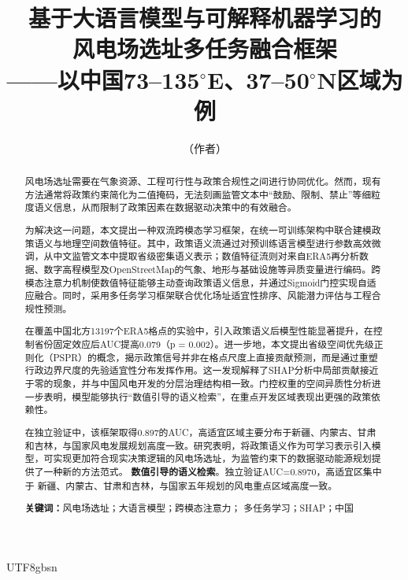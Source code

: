 \documentclass[12pt, a4paper]{article}
\begin{document}
\begin{CJK}{UTF8}{gbsn}

\title{\textbf{基于大语言模型与可解释机器学习的\\[0.3em]
风电场选址多任务融合框架}\\[0.5em]
{\large ——以中国73--135$^\circ$E、37--50$^\circ$N区域为例}}
\author{（作者）}
\date{}
\maketitle
\thispagestyle{fancy}

\begin{abstract}
风电场选址需要在气象资源、工程可行性与政策合规性之间进行协同优化。然而，现有方法通常将政策约束简化为二值掩码，无法刻画监管文本中“鼓励、限制、禁止”等细粒度语义信息，从而限制了政策因素在数据驱动决策中的有效融合。

为解决这一问题，本文提出一种双流跨模态学习框架，在统一可训练架构中联合建模政策语义与地理空间数值特征。其中，政策语义流通过对预训练语言模型进行参数高效微调，从中文监管文本中提取省级密集语义表示；数值特征流则对来自ERA5再分析数据、数字高程模型及OpenStreetMap的气象、地形与基础设施等异质变量进行编码。跨模态注意力机制使数值特征能够主动查询政策语义信息，并通过Sigmoid门控实现自适应融合。同时，采用多任务学习框架联合优化场址适宜性排序、风能潜力评估与工程合规性预测。

在覆盖中国北方13197个ERA5格点的实验中，引入政策语义后模型性能显著提升，在控制省份固定效应后AUC提高0.079（p = 0.002）。进一步地，本文提出省级空间优先级正则化（PSPR）的概念，揭示政策信号并非在格点尺度上直接贡献预测，而是通过重塑行政边界尺度的先验适宜性分布发挥作用。这一发现解释了SHAP分析中局部贡献接近于零的现象，并与中国风电开发的分层治理结构相一致。门控权重的空间异质性分析进一步表明，模型能够执行“数值引导的语义检索”，在重点开发区域表现出更强的政策依赖性。

在独立验证中，该框架取得0.897的AUC，高适宜区域主要分布于新疆、内蒙古、甘肃和吉林，与国家风电发展规划高度一致。研究表明，将政策语义作为可学习表示引入模型，可实现更加符合现实决策逻辑的风电场选址，为监管约束下的数据驱动能源规划提供了一种新的方法范式。
\textbf{数值引导的语义检索}。独立验证AUC=0.8970，高适宜区集中于
新疆、内蒙古、甘肃和吉林，与国家五年规划的风电重点区域高度一致。

\bigskip
\noindent\textbf{关键词：}风电场选址；大语言模型；跨模态注意力；%
多任务学习；SHAP；中国
\end{abstract}

\newpage
\tableofcontents
\newpage


\end{CJK}
\end{document}
